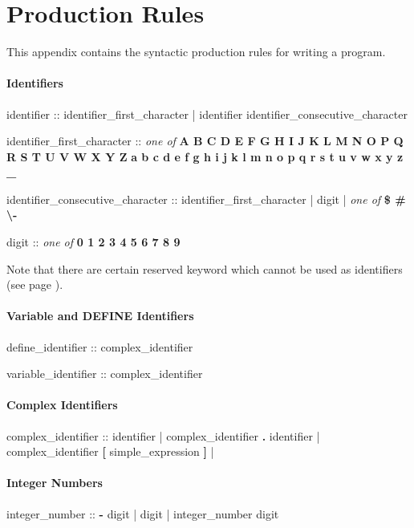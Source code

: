 \chapter{Production Rules}
This appendix contains the syntactic production rules for writing a \nusmv program.


\subsubsection{Identifiers}
\begin{Grammar}
identifier :: 
        identifier_first_character
      | identifier identifier_consecutive_character

identifier_first_character :: \emph{one of}
        \textbf{A B C D E F G H I J K L M N O P Q R S T U V W X Y Z}
        \textbf{a b c d e f g h i j k l m n o p q r s t u v w x y z _}

identifier_consecutive_character :: 
        identifier_first_character
      | digit
      | \emph{one of} \textbf{\$ \# \textbackslash -}

digit :: \emph{one of} \textbf{0 1 2 3 4 5 6 7 8 9}
\end{Grammar}

Note that there are certain reserved keyword which cannot be used as identifiers (see page \pageref{list of reserved words}).

\subsubsection{Variable and DEFINE Identifiers}
\begin{Grammar}
define_identifier :: complex_identifier

variable_identifier :: complex_identifier
\end{Grammar}


\subsubsection{Complex Identifiers}
\begin{Grammar}
complex_identifier ::
        identifier
      | complex_identifier \textbf{.} identifier
      | complex_identifier \textbf{[} simple_expression \textbf{]}
      | 
\end{Grammar}


\subsubsection{Integer Numbers}
\begin{Grammar}
integer_number ::
        \textbf{-} digit
      | digit
      | integer_number digit			
\end{Grammar}


